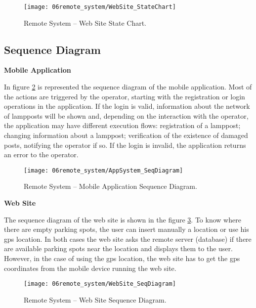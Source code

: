 \begin{figure}[H]
        \centering
        \texttt{[image: 06remote\_system/WebSite\_StateChart]}
        \caption{Remote System – Web Site State Chart.}
        \label{fig:StateChart_WebSite}
\end{figure}

\clearpage
\subsection{Sequence Diagram}
\textbf{Mobile Application}

In figure \ref{fig:SeqDiagram_application} is represented the sequence diagram of the mobile application. Most of the actions are triggered by the operator, starting with the registration or login operations in the application. If the login is valid, information about the network of lampposts will be shown and, depending on the interaction with the operator, the application may have different execution flows: registration of a lamppost; changing information about a lamppost; verification of the existence of damaged posts, notifying the operator if so. If the login is invalid, the application returns an error to the operator.

\begin{figure}[H]
        \centering
        \texttt{[image: 06remote\_system/AppSystem\_SeqDiagram]}
        \caption{Remote System – Mobile Application Sequence Diagram.}
        \label{fig:SeqDiagram_application}
\end{figure}

\textbf{Web Site}

The sequence diagram of the web site is shown in the figure \ref{fig:SeqDiagram_WebSite}. To know where there are empty parking spots, the user can insert manually a location or use his \ac{gps} location. In both cases the web site asks the remote server (database) if there are available parking spots near the location and displays them to the user. However, in the case of using the \ac{gps} location, the web site has to get the \ac{gps} coordinates from the mobile device running the web site.

\begin{figure}[H]
        \centering
        \texttt{[image: 06remote\_system/WebSite\_SeqDiagram]}
        \caption{Remote System – Web Site Sequence Diagram.}
        \label{fig:SeqDiagram_WebSite}
\end{figure}